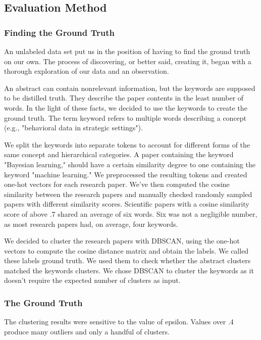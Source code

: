 \subsection{Evaluation Method}
\subsubsection{Finding the Ground Truth}
An unlabeled data set put us in the position of having to find the ground truth on our own. The process of discovering, or better said, creating it, began with a thorough exploration of our data and an observation. 


An abstract can contain nonrelevant information, but the keywords are supposed to be distilled truth. They describe the paper contents in the least number of words. In the light of these facts, we decided to use the keywords to create the ground truth. The term keyword refers to multiple words describing a concept (e.g., "behavioral data in strategic settings"). 

We split the keywords into separate tokens to account for different forms of the same concept and hierarchical categories. A paper containing the keyword "Bayesian learning," should have a certain similarity degree to one containing the keyword "machine learning." We preprocessed the resulting tokens and created one-hot vectors for each research paper. We've then computed the cosine similarity between the research papers and manually checked randomly sampled papers with different similarity scores. Scientific papers with a cosine similarity score of above .7 shared an average of six words. Six was not a negligible number, as most research papers had, on average, four keywords. 

We decided to cluster the research papers with DBSCAN, using the one-hot vectors to compute the cosine distance matrix and obtain the labels. We called these labels ground truth. We used them to check whether the abstract clusters matched the keywords clusters.
We chose DBSCAN to cluster the keywords as it doesn't require the expected number of clusters as input. 

\subsubsection{The Ground Truth}
The clustering results were sensitive to the value of epsilon. Values over .4 produce many outliers and only a handful of clusters. 